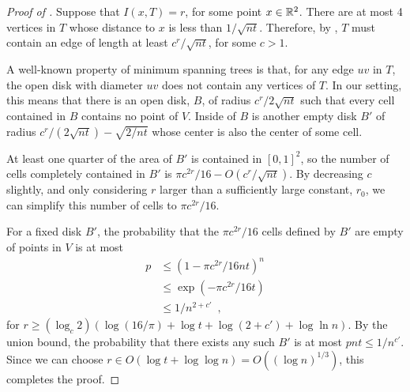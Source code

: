 \documentclass{patmorin}
\begin{document}
\begin{proof}[Proof of ]
Suppose that $I(x,T)=r$, for some point $x\in\mathbb{R}^2$.  There are at most
4 vertices in $T$ whose distance to $x$ is less than $1/\sqrt{nt}$.
Therefore, by , $T$ must contain an edge of length at least
$c^r/\sqrt{nt}$, for some $c>1$.  

A well-known property of minimum spanning trees is that, for any edge
$uv$ in $T$, the open disk with diameter $uv$ does not contain any
vertices of $T$.  In our setting, this means that there is an open disk,
$B$, of radius $c^r/2\sqrt{nt}$ such that every cell contained in $B$
contains no point of $V$.  Inside of $B$ is another empty disk $B'$ of
radius $c^r/(2\sqrt{nt})-\sqrt{2/nt}$ whose center is also the center
of some cell.

At least one quarter of the area of $B'$ is contained in $[0,1]^2$,
so the number of cells completely contained in $B'$ is $\pi c^{2r}/16 -
O(c^{r}/\sqrt{nt})$.  By decreasing $c$ slightly, and only considering
$r$ larger than a sufficiently large constant, $r_0$, we can simplify
this number of cells to $\pi c^{2r}/16$.

For a fixed disk $B'$, the probability that the $\pi c^{2r}/16$ cells
defined by $B'$ are empty of points in $V$ is at most
\begin{align*}
 p 
  & \le (1-\pi c^{2r}/{16nt})^{n} \\
  & \le \exp(-\pi c^{2r}/16t) \\
 & \le 1/n^{2+c'} \enspace ,
\end{align*}
for $r\ge(\log_c2)(\log(16/\pi)+\log t + \log(2+c')+\log\ln n)$.  By the union bound, the
probability that there exists any such $B'$ is at most
$pnt\le 1/n^{c'}$.  Since we can choose $r\in O(\log t+\log\log n) = O((\log
n)^{1/3})$, this completes the proof.
\end{proof}
\end{document}
